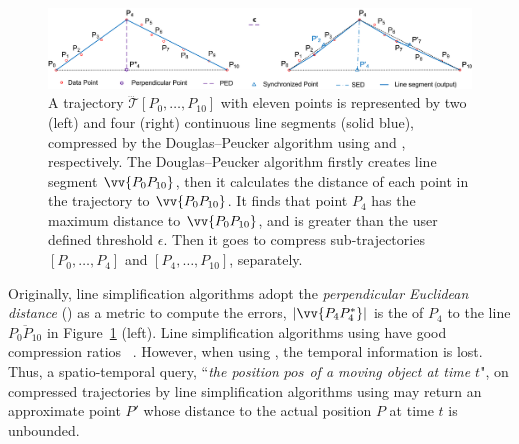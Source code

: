 \begin{figure}[tb!]
\centering
\vspace{-1ex}
\includegraphics[scale=0.76]{figures/Fig-DP.png}
\vspace{-1ex}
\caption{\small A trajectory $\dddot{\mathcal{T}}[P_0, \ldots, P_{10}]$  with eleven points is represented by two (left) and four (right) continuous line segments (solid blue), compressed by the Douglas--Peucker algorithm \cite{Douglas:Peucker} using \ped and \sed, respectively. The Douglas--Peucker algorithm firstly creates line segment $\protect\vv{P_0P_{10}}$, then it calculates the distance of each point in the trajectory to $\protect\vv{P_{0}P_{10}}$. It finds that point $P_{4}$ has the maximum distance to $\protect\vv{P_{0}P_{10}}$, and is greater than the user defined threshold $\epsilon$. Then it goes to compress sub-trajectories $[P_0, \ldots, P_{4}]$ and $[P_{4}, \ldots, P_{10}]$, separately.
}
\vspace{-2ex}
\label{fig:notations}
\end{figure}


Originally, line simplification algorithms adopt the \emph{perpendicular Euclidean distance} (\ped) as a metric to compute the errors,
\eg $|\vv{P_4P^*_4}|$ is the \ped of $P_4$ to the line $\overline{P_0P_{10}}$ in Figure~\ref{fig:notations} (left).
Line simplification algorithms using \ped have good compression ratios~ \cite{Douglas:Peucker, Hershberger:Speeding, Liu:BQS, Muckell:Compression, Chen:Trajectory, Cao:Spatio, Shi:Survey}.  However, when using \ped, the temporal information is lost. Thus, a spatio-temporal query, \eg ``\emph{the position $pos$ of a moving object at time $t$}", on  compressed trajectories by line simplification algorithms using \ped may return an approximate point $P'$ whose distance to the actual position $P$ at time $t$ is unbounded. %


